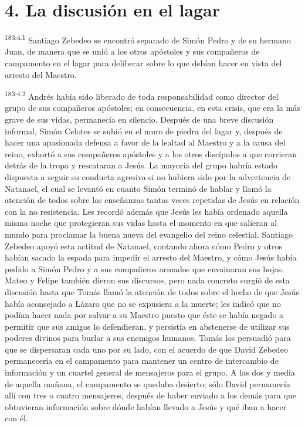 \section*{4. La discusión en el lagar}
\par
\textsuperscript{183:4.1} Santiago Zebedeo se encontró separado de Simón Pedro y de su hermano Juan, de manera que se unió a los otros apóstoles y sus compañeros de campamento en el lagar para deliberar sobre lo que debían hacer en vista del arresto del Maestro.

\par
\textsuperscript{183:4.2} Andrés había sido liberado de toda responsabilidad como director del grupo de sus compañeros apóstoles; en consecuencia, en esta crisis, que era la más grave de sus vidas, permanecía en silencio. Después de una breve discusión informal, Simón Celotes se subió en el muro de piedra del lagar y, después de hacer una apasionada defensa a favor de la lealtad al Maestro y a la causa del reino, exhortó a sus compañeros apóstoles y a los otros discípulos a que corrieran detrás de la tropa y rescataran a Jesús. La mayoría del grupo habría estado dispuesta a seguir su conducta agresiva si no hubiera sido por la advertencia de Natanael, el cual se levantó en cuanto Simón terminó de hablar y llamó la atención de todos sobre las enseñanzas tantas veces repetidas de Jesús en relación con la no resistencia. Les recordó además que Jesús les había ordenado aquella misma noche que protegieran sus vidas hasta el momento en que salieran al mundo para proclamar la buena nueva del evangelio del reino celestial. Santiago Zebedeo apoyó esta actitud de Natanael, contando ahora cómo Pedro y otros habían sacado la espada para impedir el arresto del Maestro, y cómo Jesús había pedido a Simón Pedro y a sus compañeros armados que envainaran sus hojas. Mateo y Felipe también dieron sus discursos, pero nada concreto surgió de esta discusión hasta que Tomás llamó la atención de todos sobre el hecho de que Jesús había aconsejado a Lázaro que no se expusiera a la muerte; les indicó que no podían hacer nada por salvar a su Maestro puesto que éste se había negado a permitir que sus amigos lo defendieran, y persistía en abstenerse de utilizar sus poderes divinos para burlar a sus enemigos humanos. Tomás los persuadió para que se dispersaran cada uno por su lado, con el acuerdo de que David Zebedeo permanecería en el campamento para mantener un centro de intercambio de información y un cuartel general de mensajeros para el grupo. A las dos y media de aquella mañana, el campamento se quedaba desierto; sólo David permanecía allí con tres o cuatro mensajeros, después de haber enviado a los demás para que obtuvieran información sobre dónde habían llevado a Jesús y qué iban a hacer con él.

